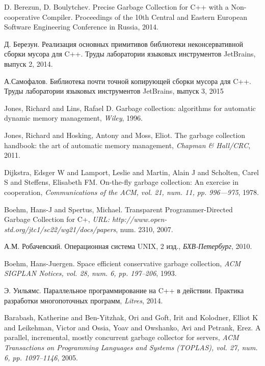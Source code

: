 \begin{thebibliography}{99}

    D. Berezun, D. Boulytchev.
    Precise Garbage Collection for C++ with a Non-cooperative Compiler.
    Proceedings of the 10th Central and Eastern European Software Engineering Conference 
    in Russia, 2014.

    Д. Березун.
    Реализация основных примитивов библиотеки неконсервативной сборки мусора для C++.
    Труды лаборатории языковых инструментов JetBrains, выпуск 2, 2014.

    А.Самофалов.
    Библиотека почти точной копирующей сборки мусора для C++.
    Труды лаборатории языковых инструментов JetBrains, выпуск 3, 2015

    Jones, Richard and Lins, Rafael D.
    Garbage collection: algorithms for automatic dynamic memory management,
    \emph{Wiley}, 1996.

    Jones, Richard and Hosking, Antony and Moss, Eliot.
    The garbage collection handbook: the art of automatic memory management,
    \emph{Chapman \& Hall/CRC}, 2011.

    Dijkstra, Edsger W and Lamport, Leslie and Martin, Alain J and Scholten, Carel S and 
    Steffens, Elisabeth FM.
    On-the-fly garbage collection: An exercise in cooperation, 
    \emph{Communications of the ACM, vol. 21, num. 11, pp. 996---975}, 1978.

    Boehm, Hans-J and Spertus, Michael.
    Transparent Programmer-Directed Garbage Collection for C+,
    \emph{URL: http://www.open-std.org/jtc1/sc22/wg21/docs/papers},
    num. 2310, 2007.

    А.М. Робачевский.
    Операционная система UNIX, 2 изд.,
    \emph{БХВ-Петербург}, 2010.

    Boehm, Hans-Juergen. 
    Space efficient conservative garbage collection, 
    \emph{ACM SIGPLAN Notices, vol. 28, num. 6, pp. 197--206},
    1993.

    Э. Уильямс.
    Параллельное программирование на C++ в действии. Практика разработки многопоточных программ,
    \emph{Litres}, 2014.

    Barabash, Katherine and Ben-Yitzhak, Ori and Goft, Irit and Kolodner, Elliot K and 
    Leikehman, Victor and Ossia, Yoav and Owshanko, Avi and Petrank, Erez.
    A parallel, incremental, mostly concurrent garbage collector for servers,
    \emph{ACM Transactions on Programming Languages and Systems (TOPLAS),  vol. 27,
    num. 6, pp. 1097--1146}, 2005.

\end{thebibliography}
